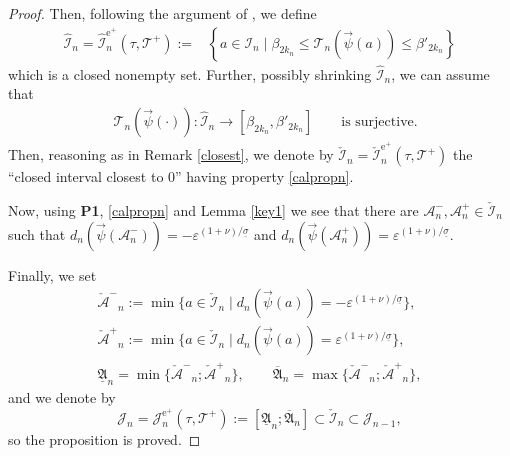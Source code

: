 \documentclass[10pt]{article}
\numberwithin{equation}{section}
\def\ep{\varepsilon}
\def\ee{{\mathrm e}}
\def\TT{{\mathcal T}}
\def\TTT{\mathscr{T}}
\newcommand\assump[1]{{\rm\textbf{#1}}}
\theoremstyle{definition}
\theoremstyle{remark}
\begin{document}
\begin{proof}
 Then, following the argument of  \cite[\S 5.1.1]{CFPrestate}, we define
\begin{equation*}
\begin{split}
\mathcal{\hat{I}}_n= \mathcal{\hat{I}}_n^{\ee^+}(\tau,\TT^+):= &   \left\{ a \in \mathcal{I}_{n}  \mid
  \beta_{2k_n} \le \TTT_{n}(\vec{\psi}(a)) \le \beta'_{2k_n}   \right\}
\end{split}
\end{equation*}
 which is a closed nonempty set.
Further, possibly shrinking $\mathcal{\hat{I}}_n$,  we can assume that
 \begin{equation}\label{calpropn}
 \begin{split}
 &  \TTT_n(\vec{\psi}(\cdot)): \mathcal{\hat{I}}_n \to [\beta_{2k_n} , \beta'_{2k_n}]   \qquad \textrm{is surjective}.
                                 \end{split}
 \end{equation}
Then, reasoning as in Remark \ref{closest}, we denote by $\mathcal{\check{I}}_n=\mathcal{\check{I}}_n^{\ee^+}(\tau,\TT^+)$ the
 ``closed interval closest to $0$'' having  property \eqref{calpropn}.

Now, using \assump{P1}, \eqref{calpropn}     and   Lemma \ref{key1}
 we see that there are
   $\mathcal{A}^-_n, \mathcal{A}^+_n \in \mathcal{\check{I}}_n $ such that
   $d_n(\vec{\psi}(\mathcal{A}^-_n))=-\ep^{(1+\nu)/\underline{\sigma}}$ and
   $d_n(\vec{\psi}(\mathcal{A}^+_n))=\ep^{(1+\nu)/\underline{\sigma}}$.

Finally, we set
\begin{equation*}\label{calhatAn}
  \begin{array}{l}
    \mathcal{\check{A}^-}_n:= \min \{ a \in \mathcal{\check{I}}_n \mid  d_n(\vec{\psi}(a))= -\ep^{(1+\nu)/\underline{\sigma}}\}, \\
    \mathcal{\check{A}^+}_n:= \min \{ a \in \mathcal{\check{I}}_n \mid  d_n(\vec{\psi}(a))= \ep^{(1+\nu)/\underline{\sigma}}\} ,\\
    \underline{\mathfrak{A}}_n= \min \{ \mathcal{\check{A}^-}_n; \mathcal{\check{A}^+}_n \}, \qquad \overline{\mathfrak{A}}_n= \max \{
    \mathcal{\check{A}^-}_n;
    \mathcal{\check{A}^+}_n \},
  \end{array}
\end{equation*}
and   we denote by
 \begin{equation}\label{calJne}
  \mathcal{J}_n=\mathcal{J}_n^{\ee^+}(\tau,\TT^+):=[\underline{\mathfrak{A}}_n;\overline{\mathfrak{A}}_n]  \subset \mathcal{\check{I}}_n
  \subset \mathcal{J}_{n-1},
\end{equation}
 so the proposition is proved.
\end{proof}
\end{document}
